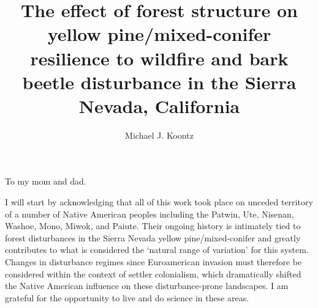 \documentclass[twoside,12pt,final]{ucthesis-CA2012}
\begin{document}
\begin{ucfrontmatter}


  \title{The effect of forest structure on yellow pine/mixed-conifer resilience
to wildfire and bark beetle disturbance in the Sierra Nevada, California}
  \author{Michael J. Koontz}

   
  \othermemberC{} %
  
	\maketitle
	
	\copyrightpage

    \begin{dedication}

      \vspace*{20ex}
      \begin{center}
      \begin{large}

        To my mom and dad.

      \end{large}
      \end{center}
  \end{dedication}
\begin{acknowledgements}
    I will start by acknowledging that all of this work took place on
    unceded territory of a number of Native American peoples including the
    Patwin, Ute, Nisenan, Washoe, Mono, Miwok, and Paiute. Their ongoing
    history is intimately tied to forest disturbances in the Sierra Nevada
    yellow pine/mixed-conifer and greatly contributes to what is considered
    the `natural range of variation' for this system. Changes in disturbance
    regimes since Euroamerican invasion must therefore be considered within
    the context of settler colonialism, which dramatically shifted the
    Native American influence on these disturbance-prone landscapes. I am
    grateful for the opportunity to live and do science in these areas.
    

\end{acknowledgements}
\end{ucfrontmatter}
\end{document}
